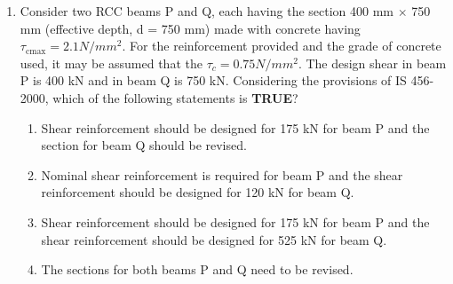 \documentclass[journal,12pt,onecolumn]{IEEEtran}
\theoremstyle{remark}
\begin{document}
\begin{enumerate}
\item Consider two RCC beams P and Q, each having the section 400 mm $\times$ 750 mm (effective depth, d = 750 mm) made with concrete having $\tau_{\text{cmax}} = 2.1 N/mm^{2}$. For the reinforcement provided and the grade of concrete used, it may be assumed that the $\tau_c = 0.75 N/mm^{2}$. The design shear in beam P is 400 kN and in beam Q is 750 kN. Considering the provisions of IS 456-2000, which of the following statements is \textbf{TRUE}?
	\begin{enumerate}
		\item Shear reinforcement should be designed for 175 kN for beam P and the section for beam Q should be revised.
		\item Nominal shear reinforcement is required for beam P and the shear reinforcement should be designed for 120 kN for beam Q.
		\item Shear reinforcement should be designed for 175 kN for beam P and the shear reinforcement should be designed for 525 kN for beam Q.
		\item The sections for both beams P and Q need to be revised.
	\end{enumerate}


\end{enumerate}
\end{document}
